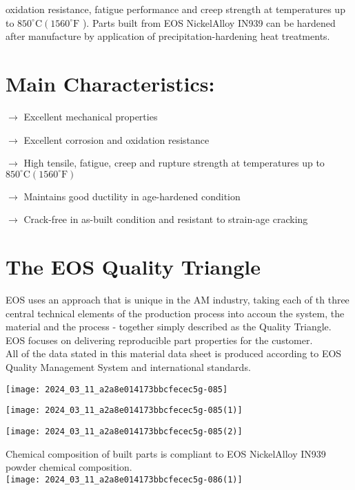 \documentclass[10pt]{article}
\begin{document}
oxidation resistance, fatigue performance and creep strength at temperatures up to $850^{\circ} \mathrm{C}\left(1560^{\circ} \mathrm{F}\right.$ ). Parts built from EOS NickelAlloy IN939 can be hardened after manufacture by application of precipitation-hardening heat treatments.

\section*{Main Characteristics:}
$\longrightarrow$ Excellent mechanical properties

$\longrightarrow$ Excellent corrosion and oxidation resistance

$\longrightarrow$ High tensile, fatigue, creep and rupture strength at temperatures up to $850^{\circ} \mathrm{C}\left(1560^{\circ} \mathrm{F}\right)$

$\longrightarrow$ Maintains good ductility in age-hardened condition

$\longrightarrow$ Crack-free in as-built condition and resistant to strain-age cracking

\section*{The EOS Quality Triangle}
EOS uses an approach that is unique in the AM industry, taking each of th three central technical elements of the production process into accoun the system, the material and the process - together simply described as the Quality Triangle. EOS focuses on delivering reproducible part properties for the customer.\\
All of the data stated in this material data sheet is produced according to EOS Quality Management System and international standards.

\begin{center}
\texttt{[image: 2024\_03\_11\_a2a8e014173bbcfecec5g-085]}
\end{center}

\begin{center}
\texttt{[image: 2024\_03\_11\_a2a8e014173bbcfecec5g-085(1)]}
\end{center}

\begin{center}
\texttt{[image: 2024\_03\_11\_a2a8e014173bbcfecec5g-085(2)]}
\end{center}

Chemical composition of built parts is compliant to EOS NickelAlloy IN939 powder chemical composition.\\
\texttt{[image: 2024\_03\_11\_a2a8e014173bbcfecec5g-086(1)]}
\end{document}
